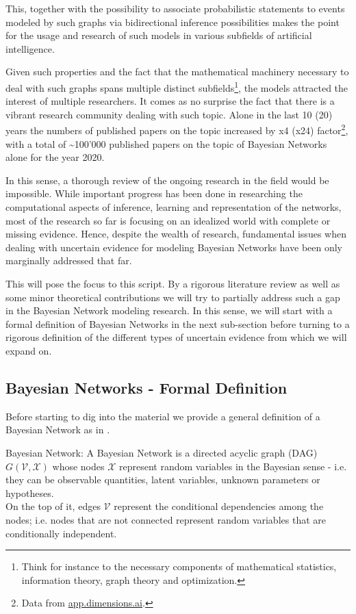 \documentclass[11pt]{article}
\begin{document}
\begin{article}
This, together with the possibility to associate probabilistic
statements to events modeled by such graphs via bidirectional
inference possibilities makes the point for the usage and research
of such models in various subfields of artificial intelligence.

Given such properties and the fact that the mathematical machinery
necessary to deal with such graphs spans multiple distinct
subfields\footnote{Think for instance to the necessary components of mathematical
statistics, information theory, graph theory and optimization.}, the models attracted the interest of multiple
researchers. It comes as no surprise the fact that there is a
vibrant research community dealing with such topic. Alone in the
last 10 (20) years the numbers of published papers on the topic
increased by x4 (x24) factor\footnote{Data from \href{https://app.dimensions.ai/discover/publication}{app.dimensions.ai}.}, with a total of \textasciitilde{}100'000
published papers on the topic of Bayesian Networks alone for the
year 2020.

In this sense, a thorough review of the ongoing research in the
field would be impossible. While important progress has been done
in researching the computational aspects of inference, learning and
representation of the networks, most of the research so far is
focusing on an idealized world with complete or missing
evidence. Hence, despite the wealth of research, fundamental issues
when dealing with uncertain evidence for modeling Bayesian Networks
have been only marginally addressed that far.

This will pose the focus to this script. By a rigorous literature
review as well as some minor theoretical contributions we will try to
partially address such a gap in the Bayesian Network modeling
research. In this sense, we will start with a formal definition of
Bayesian Networks in the next sub-section before turning to a
rigorous definition of the different types of uncertain evidence
from which we will expand on.

\subsection{Bayesian Networks - Formal Definition}
\label{sec:org066ede8}
Before starting to dig into the material we provide a general
definition of a Bayesian Network as in \cite{pearl2011bayesian}.

\begin{definition}
Bayesian Network: A Bayesian Network is a directed acyclic graph (DAG) $G(\mathscr{V}, \mathscr{X})$
whose nodes $\mathscr{X}$ represent random variables in the Bayesian sense - i.e. they can be observable
quantities, latent variables, unknown parameters or hypotheses. \\
On the top of it, edges $\mathscr{V}$ represent the conditional dependencies among the nodes; i.e. nodes that
are not connected represent random variables that are conditionally independent.
\end{definition}


\end{article}
\end{document}
